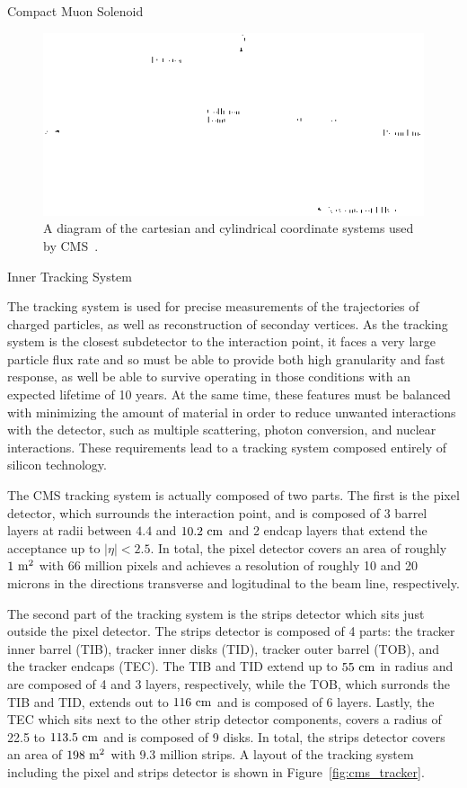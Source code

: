 \begin{section}{Compact Muon Solenoid}
\begin{figure}[tbp!]
\begin{center}
\includegraphics[angle=0,width=0.80\columnwidth]{fig/cms_coordinate_system.png}
\end{center}
\caption{A diagram of the cartesian and cylindrical coordinate systems used by CMS~\cite{Schott:1699952}.}
\label{fig:cms_coordinate_system}
\end{figure}

\begin{subsection}{Inner Tracking System}

The tracking system is used for precise measurements of the trajectories of charged particles, as well as reconstruction of seconday vertices.
As the tracking system is the closest subdetector to the interaction point, it faces a very large particle flux rate and so must be able to provide both high granularity and fast response, as well be able to survive operating in those conditions with an expected lifetime of 10 years.
At the same time, these features must be balanced with minimizing the amount of material in order to reduce unwanted interactions with the detector, such as multiple scattering, photon conversion, and nuclear interactions.
These requirements lead to a tracking system composed entirely of silicon technology.

The CMS tracking system is actually composed of two parts.
The first is the pixel detector, which surrounds the interaction point, and is composed of 3 barrel layers at radii between $4.4$ and $10.2~\mathrm{cm}$ and 2 endcap layers that extend the acceptance up to $|\eta| < 2.5$.
In total, the pixel detector covers an area of roughly $1~\mathrm{m}^2$ with 66 million pixels and achieves a resolution of roughly 10 and 20 microns in the directions transverse and logitudinal to the beam line, respectively.

The second part of the tracking system is the strips detector which sits just outside the pixel detector.
The strips detector is composed of 4 parts: the tracker inner barrel (TIB), tracker inner disks (TID), tracker outer barrel (TOB), and the tracker endcaps (TEC).
The TIB and TID extend up to $55~\mathrm{cm}$ in radius and are composed of 4 and 3 layers, respectively, while the TOB, which surronds the TIB and TID, extends out to $116~\mathrm{cm}$ and is composed of 6 layers.
Lastly, the TEC which sits next to the other strip detector components, covers a radius of 22.5 to $113.5~\mathrm{cm}$ and is composed of 9 disks.
In total, the strips detector covers an area of $198~\mathrm{m}^2$ with 9.3 million strips.
A layout of the tracking system including the pixel and strips detector is shown in Figure~\ref{fig:cms_tracker}.


\end{subsection}
\end{section}
